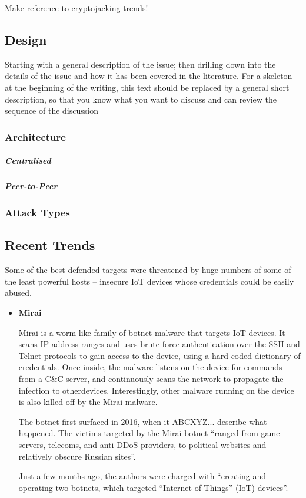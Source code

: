 Make reference to cryptojacking trends!

\subsection{Design}

Starting with a general description of the issue; then drilling down into the details of the issue and how it has been covered in the literature. For a skeleton at the beginning of the writing, this text should be replaced by a general short description, so that you know what you want to discuss and can review the sequence of the discussion

\subsubsection{Architecture}
\subparagraph{Centralised}
\subparagraph{Peer-to-Peer}

\subsubsection{Attack Types}


\subsection{Recent Trends}


Some of the best-defended targets were threatened by huge numbers of some of the least powerful hosts – insecure IoT devices whose credentials could be easily abused.

\begin{itemize}
	\item \textbf{Mirai}
	
	Mirai is a worm-like family of botnet malware that targets IoT devices. It scans IP address ranges and uses brute-force authentication over the SSH and Telnet protocols to gain access to the device, using a hard-coded dictionary of credentials. Once inside, the malware listens on the device for commands from a C&C server, and continuously scans the network to propagate the infection to otherdevices. Interestingly, other malware running on the device is also killed off by the Mirai malware. 
	
	The botnet first surfaced in 2016, when it {ABCXYZ... describe what happened}. The victims targeted by the Mirai botnet “ranged from game servers, telecoms, and anti-DDoS providers, to political websites and relatively obscure Russian sites”.
		
	Just a few months ago, the authors were charged with “creating and operating two botnets, which targeted “Internet of Things” (IoT) devices”.
\end{itemize}

